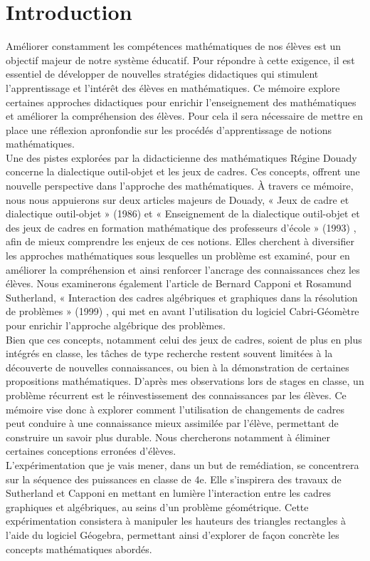 \section*{Introduction}

Améliorer constamment les compétences mathématiques de nos élèves est un objectif majeur de notre système éducatif.
Pour répondre à cette exigence,
il est essentiel de développer de nouvelles stratégies didactiques qui stimulent l'apprentissage et l'intérêt des élèves en mathématiques.
Ce mémoire explore certaines approches didactiques pour enrichir l'enseignement des mathématiques et améliorer la compréhension des élèves. 
Pour cela il sera nécessaire de mettre en place une réflexion apronfondie sur les procédés d'apprentissage de notions mathématiques.\\

Une des pistes explorées par la didacticienne des mathématiques Régine Douady concerne la dialectique outil-objet et les jeux de cadres.
Ces concepts,
offrent une nouvelle perspective dans l'approche des mathématiques.
À travers ce mémoire, nous nous appuierons sur deux articles majeurs de Douady,
« Jeux de cadre et dialectique outil-objet » (1986) \cite{douady1} et « Enseignement de la dialectique outil-objet et des jeux de cadres en formation mathématique des professeurs d'école » (1993) \cite{douady2},
afin de mieux comprendre les enjeux de ces notions.
Elles cherchent à diversifier les approches mathématiques sous lesquelles un problème est examiné,
pour en améliorer la compréhension et ainsi renforcer l'ancrage des connaissances chez les élèves.
Nous examinerons également l'article de Bernard Capponi et Rosamund Sutherland,
« Interaction des cadres algébriques et graphiques dans la résolution de problèmes » (1999) \cite{capponi},
qui met en avant l'utilisation du logiciel Cabri-Géomètre pour enrichir l'approche algébrique des problèmes.\\

Bien que ces concepts, notamment celui des jeux de cadres, soient de plus en plus intégrés en classe,
les tâches de type recherche restent souvent limitées à la découverte de nouvelles connaissances,
ou bien à la démonstration de certaines propositions mathématiques.
D'après mes observations lors de stages en classe,
un problème récurrent est le réinvestissement des connaissances par les élèves.
Ce mémoire vise donc à explorer comment l'utilisation de changements de cadres peut conduire à une connaissance mieux assimilée par l'élève,
permettant de construire un savoir plus durable.
Nous chercherons notamment à éliminer certaines conceptions erronées d'élèves.\\

L'expérimentation que je vais mener,
dans un but de remédiation,
se concentrera sur la séquence des puissances en classe de 4e.
Elle s'inspirera des travaux de Sutherland et Capponi en mettant en lumière l'interaction entre les cadres graphiques et algébriques,
au seins d'un problème géométrique.
Cette expérimentation consistera à manipuler les hauteurs des triangles rectangles à l'aide du logiciel Géogebra,
permettant ainsi d'explorer de façon concrète les concepts mathématiques abordés.